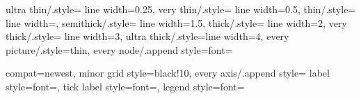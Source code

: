 \newcommand{\plotscale}{1}

\newcommand{\splotscale}{0.7}

\newcommand{\plotratio}{0.618}

\newlength{\mylinewidth}
\setlength{\mylinewidth}{0.6pt}

\newcommand{\plotfontsize}{\footnotesize}

\tikzset
{
  ultra thin/.style= {line width=0.25\mylinewidth},
  very thin/.style=  {line width=0.5\mylinewidth},
  thin/.style=       {line width=\mylinewidth},
  semithick/.style=  {line width=1.5\mylinewidth},
  thick/.style=      {line width=2\mylinewidth},
  very thick/.style= {line width=3\mylinewidth},
  ultra thick/.style={line width=4\mylinewidth},
  every picture/.style={thin},
  every node/.append style={font=\plotfontsize}
}

\pgfplotsset
{
  compat=newest,
  minor grid style={black!10},
  every axis/.append style=
  {
    label style={font=\plotfontsize},
    tick label style={font=\plotfontsize},
    legend style={font=\plotfontsize}
  }
}

\newlength{\tikzthin}
\setlength{\tikzthin}{\mylinewidth}

\pgfplotsset{plot coordinates/math parser=false}
\newlength{\fwidth}
\newlength{\fheight}
\setlength{\fwidth}{\plotscale\linewidth}
\setlength{\fheight}{\plotratio\fwidth}

\newlength{\sfwidth}
\newlength{\sfheight}
\setlength{\sfwidth}{\splotscale\linewidth}
\setlength{\sfheight}{\plotratio\sfwidth}

\let\OrgPgfTransformScale\pgftransformscale

